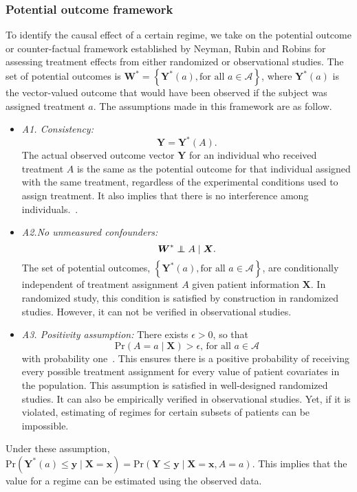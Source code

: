 \documentclass[12pt]{article}
\newcommand{\bs}{ \boldsymbol}
\newcommand{\ml}{\mathcal}
\newcommand{\lt}{\left}
\newcommand{\rt}{\right}
\newcommand\indep{\protect\mathpalette{\protect\independenT}{\perp}}
\def\independenT#1#2{\mathrel{\rlap{$#1#2$}\mkern2mu{#1#2}}}
\begin{document}
\subsubsection{Potential outcome framework}
To identify the causal effect of a certain regime, we take on the potential outcome or counter-factual framework established by Neyman, Rubin and Robins for assessing treatment effects from either randomized or observational studies. 
The set of potential outcomes is $\bs{W}^{*} = \lt\{ \bs{Y}^*\lt(a\rt), \text{for all } a \in \ml{A} \rt\}$, where $\bs{Y}^{*}\lt(a\rt)$ is the vector-valued outcome that would have been observed if the subject was assigned treatment $a$. The assumptions made in this framework are as follow.
\begin{itemize}
	\item \textit{A1. Consistency:}
	$$\bs{Y} = \bs{Y}^{*}\lt(A\rt).$$
	The actual observed outcome vector $\bs{Y}$ for an individual who received treatment $A$ is the same as the potential outcome for that individual assigned with the same  treatment, regardless of the experimental conditions used to assign treatment. It also implies that there is no interference among individuals.~\cite{Rubin1980}. 
	
	\item \textit{A2.No unmeasured confounders:}
	$$\bs{W}^* \indep  A \mid \bs{X}.$$
	The set of potential outcomes, $\lt\{ \bs{Y}^*\lt(a\rt), \text{for all } a \in \ml{A} \rt\}$, are conditionally independent of treatment assignment $A$ given patient information $\bs{X}$. In randomized study, this condition is satisfied by construction in randomized studies. However, it can not be verified in observational studies.
	~\cite{Robins1997}
	\item \textit{A3. Positivity assumption:}
	There exists $\epsilon > 0$, so that 
	$$\text{Pr}(A = a \mid \bs{X}) > \epsilon \text{, for all } a 
	\in \ml{A}$$ with probability one~\cite{Hernan2006}.  This ensures there is a positive probability of receiving every possible treatment assignment for every value of patient covariates in the population. This assumption is satisfied in well-designed randomized studies. It can also be empirically verified in observational studies. Yet, if it is violated, estimating of regimes for certain subsets of patients can be impossible.
\end{itemize}
Under these assumption, $\text{Pr}\lt(\bs{Y}^*\lt(a\rt) \le \bs{y} \mid \bs{X} = \bs{x}\rt) = \text{Pr}\lt(\bs{Y} \le \bs{y} \mid \bs{X} = \bs{x}, A = a\rt)$. This implies that the value for a regime can be estimated using the observed data.
\end{document}
